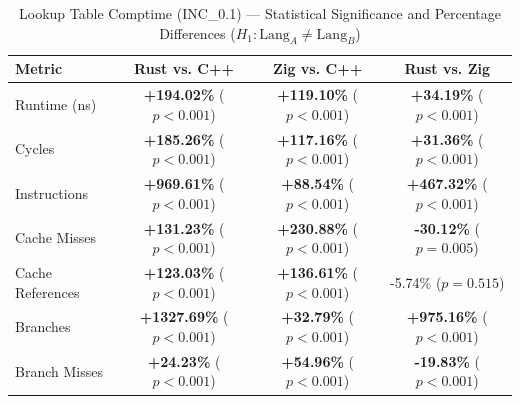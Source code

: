 \begin{table}[htbp]
\centering
\caption{Lookup Table Comptime (INC_0.1) --- Statistical Significance and Percentage Differences ($H_1: \text{Lang}_A \neq \text{Lang}_B$)}
\label{tab:lut_comptime_0_1}
\begin{tabular}{l ccc}
\toprule
\textbf{Metric} & \textbf{Rust vs. C++} & \textbf{Zig vs. C++} & \textbf{Rust vs. Zig} \\
\midrule
Runtime (ns) & \textbf{+194.02\%} ($p < 0.001$) & \textbf{+119.10\%} ($p < 0.001$) & \textbf{+34.19\%} ($p < 0.001$) \\
Cycles & \textbf{+185.26\%} ($p < 0.001$) & \textbf{+117.16\%} ($p < 0.001$) & \textbf{+31.36\%} ($p < 0.001$) \\
Instructions & \textbf{+969.61\%} ($p < 0.001$) & \textbf{+88.54\%} ($p < 0.001$) & \textbf{+467.32\%} ($p < 0.001$) \\
Cache Misses & \textbf{+131.23\%} ($p < 0.001$) & \textbf{+230.88\%} ($p < 0.001$) & \textbf{-30.12\%} ($p = 0.005$) \\
Cache References & \textbf{+123.03\%} ($p < 0.001$) & \textbf{+136.61\%} ($p < 0.001$) & -5.74\% ($p = 0.515$) \\
Branches & \textbf{+1327.69\%} ($p < 0.001$) & \textbf{+32.79\%} ($p < 0.001$) & \textbf{+975.16\%} ($p < 0.001$) \\
Branch Misses & \textbf{+24.23\%} ($p < 0.001$) & \textbf{+54.96\%} ($p < 0.001$) & \textbf{-19.83\%} ($p < 0.001$) \\
\bottomrule
\end{tabular}
\end{table}


